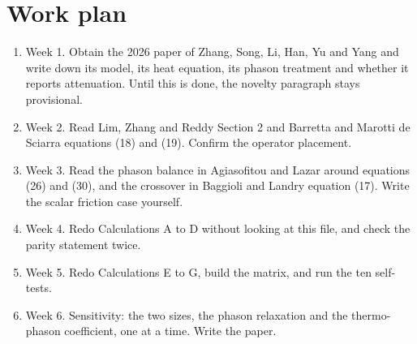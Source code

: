 \documentclass[11pt,a4paper]{article}
\begin{document}
\section{Work plan}

\begin{enumerate}
\item Week 1. Obtain the 2026 paper of Zhang, Song, Li, Han, Yu and Yang and write down its model, its heat
equation, its phason treatment and whether it reports attenuation. Until this is done, the novelty paragraph
stays provisional.
\item Week 2. Read Lim, Zhang and Reddy Section 2 and Barretta and Marotti de Sciarra equations (18) and
(19). Confirm the operator placement.
\item Week 3. Read the phason balance in Agiasofitou and Lazar around equations (26) and (30), and the
crossover in Baggioli and Landry equation (17). Write the scalar friction case yourself.
\item Week 4. Redo Calculations A to D without looking at this file, and check the parity statement twice.
\item Week 5. Redo Calculations E to G, build the matrix, and run the ten self-tests.
\item Week 6. Sensitivity: the two sizes, the phason relaxation and the thermo-phason coefficient, one at a
time. Write the paper.
\end{enumerate}



\end{document}
